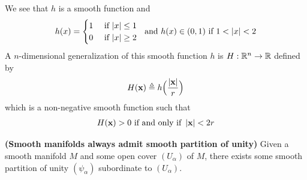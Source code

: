 \documentclass{report}
\begin{document}
\begin{mdframed}
\begin{center}
\end{center}
We see that $h$ is a smooth function and 
\begin{align*}
h(x)=\begin{cases}
  1& \text{ if $\left|x\right|\leq 1$ }\\
  0& \text{ if $\left|x\right|\geq 2$ }
\end{cases}\text{ and }h(x)\in (0,1)\text{ if } 1< \left|x\right|< 2
\end{align*}
A $n$-dimensional generalization of this smooth function $h$ is  $H:\mathbb{R}^n\rightarrow \mathbb{R}$ defined by 
\begin{align*}
H(\textbf{x})\triangleq  h\Big(\frac{\left|\textbf{x}\right|}{r}\Big)
\end{align*}
which is a non-negative smooth function such that 
\begin{align*}
H(\textbf{x})>0\text{ if and only if }\left|\textbf{x}\right|< 2r
\end{align*}
\end{mdframed}
\begin{theorem}
\label{Smooth manifolds always admit smooth partition of unity}
\textbf{(Smooth manifolds always admit smooth partition of unity)} Given a smooth manifold $M$ and some open cover  $(U_\alpha )$ of $M$, there exists some smooth partition of unity  $(\psi_\alpha )$ subordinate to $(U_\alpha )$. 
\end{theorem}
\end{document}

